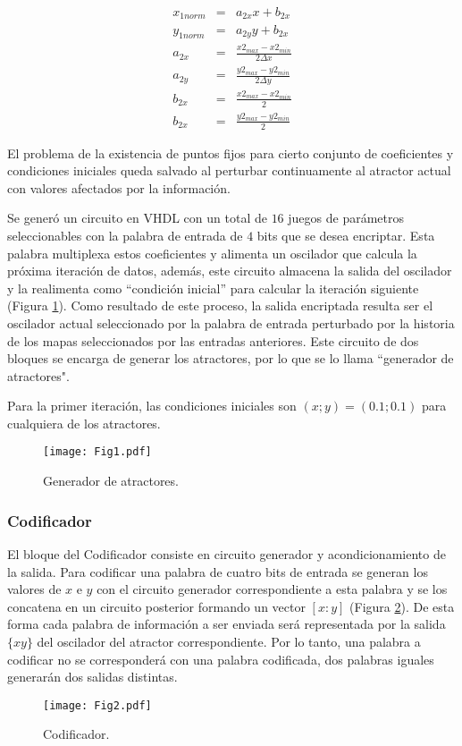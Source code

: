 %
\begin{eqnarray}\label{eq:norm_entrada}
x_{1norm}&=& a_{2x} x+b_{2x} \nonumber\\
y_{1norm}&=& a_{2y} y+b_{2x} \nonumber\\
a_{2x}&=& \frac{x2_{max}-x2_{min}}{2\Delta x} \nonumber\\
a_{2y}&=& \frac{y2_{max}-y2_{min}}{2\Delta y} \nonumber\\
b_{2x}&=& \frac{x2_{max}-x2_{min}}{2} \nonumber\\
b_{2x}&=& \frac{y2_{max}-y2_{min}}{2}
\end{eqnarray}

El problema de la existencia de puntos fijos para cierto conjunto de coeficientes y condiciones iniciales queda salvado al perturbar continuamente al atractor actual con valores afectados por la información.

Se generó un circuito en VHDL con un total de $16$ juegos de parámetros seleccionables con la palabra de entrada de $4$ bits que se desea encriptar.
Esta palabra multiplexa estos coeficientes y alimenta un oscilador que calcula la próxima iteración de datos, además, este circuito almacena la salida del oscilador y la realimenta como ``condición inicial'' para calcular la iteración siguiente (Figura \ref{fig:generador}).
Como resultado de este proceso, la salida encriptada resulta ser el oscilador actual seleccionado por la palabra de entrada perturbado por la historia de los mapas seleccionados por las entradas anteriores.
Este circuito de dos bloques se encarga de generar los atractores, por lo que se lo llama ``generador de atractores".

Para la primer iteración, las condiciones iniciales son $(x;y)=(0.1;0.1)$ para cualquiera de los atractores.
%
\begin{figure}
    \centering
    \texttt{[image: Fig1.pdf]}\\
    \caption{Generador de atractores.}\label{fig:generador}
\end{figure}

\subsubsection{Codificador}
El bloque del Codificador consiste en circuito generador y acondicionamiento de la salida.
Para codificar una palabra de cuatro bits de entrada se generan los valores de $x$ e $y$ con el circuito generador correspondiente a esta palabra y se los concatena en un circuito posterior formando un vector $[x:y]$ (Figura \ref{fig:codificador}).
De esta forma cada palabra de información a ser enviada será representada por la salida $\{xy\}$ del oscilador del atractor correspondiente.
Por lo tanto, una palabra a codificar no se corresponderá con una palabra codificada, dos palabras iguales generarán dos salidas distintas.
%
\begin{figure}
    \centering
    \texttt{[image: Fig2.pdf]}\\
    \caption{Codificador.}\label{fig:codificador}
\end{figure}

